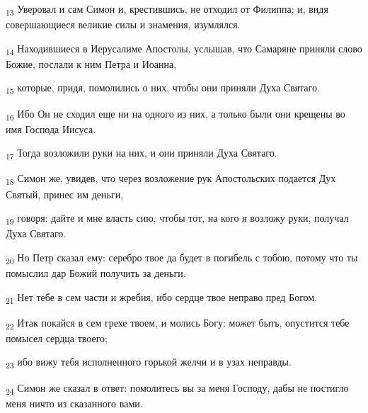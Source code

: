 \begin{tcolorbox}
\textsubscript{13} Уверовал и сам Симон и, крестившись, не отходил от Филиппа; и, видя совершающиеся великие силы и знамения, изумлялся.
\end{tcolorbox}
\begin{tcolorbox}
\textsubscript{14} Находившиеся в Иерусалиме Апостолы, услышав, что Самаряне приняли слово Божие, послали к ним Петра и Иоанна,
\end{tcolorbox}
\begin{tcolorbox}
\textsubscript{15} которые, придя, помолились о них, чтобы они приняли Духа Святаго.
\end{tcolorbox}
\begin{tcolorbox}
\textsubscript{16} Ибо Он не сходил еще ни на одного из них, а только были они крещены во имя Господа Иисуса.
\end{tcolorbox}
\begin{tcolorbox}
\textsubscript{17} Тогда возложили руки на них, и они приняли Духа Святаго.
\end{tcolorbox}
\begin{tcolorbox}
\textsubscript{18} Симон же, увидев, что через возложение рук Апостольских подается Дух Святый, принес им деньги,
\end{tcolorbox}
\begin{tcolorbox}
\textsubscript{19} говоря: дайте и мне власть сию, чтобы тот, на кого я возложу руки, получал Духа Святаго.
\end{tcolorbox}
\begin{tcolorbox}
\textsubscript{20} Но Петр сказал ему: серебро твое да будет в погибель с тобою, потому что ты помыслил дар Божий получить за деньги.
\end{tcolorbox}
\begin{tcolorbox}
\textsubscript{21} Нет тебе в сем части и жребия, ибо сердце твое неправо пред Богом.
\end{tcolorbox}
\begin{tcolorbox}
\textsubscript{22} Итак покайся в сем грехе твоем, и молись Богу: может быть, опустится тебе помысел сердца твоего;
\end{tcolorbox}
\begin{tcolorbox}
\textsubscript{23} ибо вижу тебя исполненного горькой желчи и в узах неправды.
\end{tcolorbox}
\begin{tcolorbox}
\textsubscript{24} Симон же сказал в ответ: помолитесь вы за меня Господу, дабы не постигло меня ничто из сказанного вами.
\end{tcolorbox}
